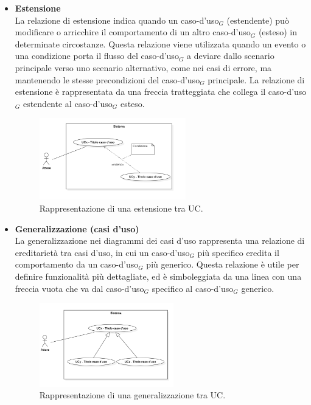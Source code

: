 \documentclass[10pt]{article}
\begin{document}
\begin{justify}
\begin{itemize}
            \item \textbf{Estensione}\\
            La relazione di estensione indica quando un caso-d'uso$_G$ (estendente) può modificare o arricchire il comportamento di un altro caso-d'uso$_G$ (esteso) in determinate circostanze. Questa relazione viene utilizzata quando un evento o una condizione porta il flusso del caso-d'uso$_G$ a deviare dallo scenario principale verso uno scenario alternativo, come nei casi di errore, ma mantenendo le stesse precondizioni del caso-d'uso$_G$ principale. La relazione di estensione è rappresentata da una freccia tratteggiata che collega il caso-d'uso$_G$ estendente al caso-d'uso$_G$ esteso.
            \begin{figure}[H]
            \centering
            \includegraphics[width=0.6\textwidth]{EstensioneUC.PNG}
            \caption{Rappresentazione di una estensione tra UC.}
            \end{figure}

            \item \textbf{Generalizzazione (casi d'uso)}\\
            La generalizzazione nei diagrammi dei casi d'uso rappresenta una relazione di ereditarietà tra casi d'uso, in cui un caso-d'uso$_G$ più specifico eredita il comportamento da un caso-d'uso$_G$ più generico. Questa relazione è utile per definire funzionalità più dettagliate, ed è simboleggiata da una linea con una freccia vuota che va dal caso-d'uso$_G$ specifico al caso-d'uso$_G$ generico.
            \begin{figure}[H]
            \centering
            \includegraphics[width=0.55\textwidth]{GeneralizzazioneUC.PNG}
            \caption{Rappresentazione di una generalizzazione tra UC.}
            \end{figure}
        \end{itemize}


\end{justify}
\end{document}
